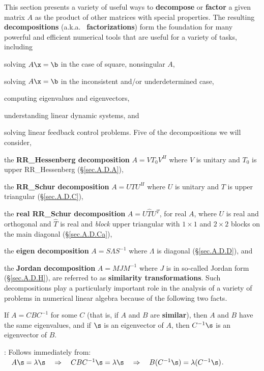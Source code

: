 This section presents a variety of useful ways to {\bf decompose} or
{\bf factor} a given matrix $A$ as the product of other matrices with
special properties.  The resulting {\bf decompositions} (a.k.a.~{\bf
factorizations}) form the foundation for many powerful and efficient
numerical tools that are useful for a variety of tasks, including
\beginmylistb
\item solving $A\x=\b$ in the case of square, nonsingular $A$,
\item solving $A\x=\b$ in the inconsistent and/or underdetermined case,
\item computing eigenvalues and eigenvectors,
\item understanding linear dynamic systems, and
\item solving linear feedback control problems.
\endmylist
Five of the decompositions we will consider,
\beginmylistb
\item the {\bf RR_Hessenberg decomposition} $A=V T_{0} V^{H}$ where $V$ is unitary and $T_0$ is upper RR_Hessenberg (\S \ref{sec.A.D.A}),
\item the {\bf RR_Schur decomposition} $A=UTU^{H}$ where $U$ is unitary and $T$ is upper triangular (\S \ref{sec.A.D.C}),
\item the {\bf real RR_Schur decomposition} $A=U{\hat T}U^{T}$, for real $A$, where $U$ is real and orthogonal and ${\hat T}$ is real and
{\it block} upper triangular with $1\times 1$ and $2\times 2$ blocks on the main diagonal (\S \ref{sec.A.D.Ca}),
\item the {\bf eigen decomposition} $A=S\Lambda S^{-1}$ where $\Lambda$ is diagonal (\S \ref{sec.A.D.D}), and
\item the {\bf Jordan decomposition} $A=MJM^{-1}$ where $J$ is in so-called Jordan form (\S \ref{sec.A.D.H}),
\endmylist
are referred to as {\bf similarity transformations}.  Such
decompositions play a particularly important role in the analysis of a
variety of problems in numerical linear algebra because of the
following two facts.\medskip

\begin{fact} \label{fact.A.D.A}
If $A=CBC^{-1}$ for some $C$ (that is, if $A$
and $B$ are {\bf similar}), then $A$ and $B$ have the same
eigenvalues, and if $\s$ is an eigenvector of $A$, then $C^{-1}\s$ is
an eigenvector of $B$.
\end{fact}

\/: Follows immediately from:
$\quad A\s=\lambda\s \quad \Rightarrow \quad CBC^{-1}\s=\lambda\s \quad \Rightarrow \quad B(C^{-1}\s)=\lambda(C^{-1}\s)$. \endproof

